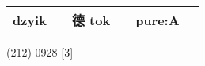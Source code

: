 \documentclass[14pt,a4paper]{scrartcl}
\begin{document}
\begin{longtable}[c]{@{}llllll@{}}
\begin{minipage}[t]{0.14\columnwidth}
dzyik
\strut\end{minipage} &
\begin{minipage}[t]{0.14\columnwidth}\raggedright\strut
\strut\end{minipage} &
\begin{minipage}[t]{0.14\columnwidth}\raggedright\strut
德 tok
\strut\end{minipage} &
\begin{minipage}[t]{0.14\columnwidth}\raggedright\strut
\strut\end{minipage} &
\begin{minipage}[t]{0.14\columnwidth}\raggedright\strut
pure:A
\strut\end{minipage}\tabularnewline
\bottomrule
\end{longtable}

(212) 0928 {[}3{]}
\end{document}
